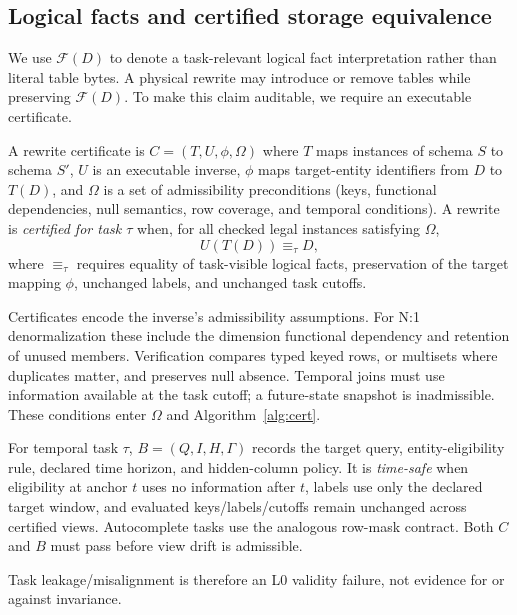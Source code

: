 \documentclass[runningheads]{llncs}
\newcommand{\facts}{\mathcal{F}}
\newcommand{\task}{\tau}
\begin{document}
\subsection{Logical facts and certified storage equivalence}
We use $\facts(D)$ to denote a task-relevant logical fact interpretation rather than literal table bytes. A physical rewrite may introduce or remove tables while preserving $\facts(D)$. To make this claim auditable, we require an executable certificate.

\begin{definition}
A rewrite certificate is $C=(T,U,\phi,\Omega)$ where $T$ maps instances of schema $S$ to schema $S'$, $U$ is an executable inverse, $\phi$ maps target-entity identifiers from $D$ to $T(D)$, and $\Omega$ is a set of admissibility preconditions (keys, functional dependencies, null semantics, row coverage, and temporal conditions). A rewrite is \emph{certified for task $\task$} when, for all checked legal instances satisfying $\Omega$,
\begin{equation}
U(T(D)) \equiv_{\task} D,
\label{eq:roundtrip}
\end{equation}
where $\equiv_{\task}$ requires equality of task-visible logical facts, preservation of the target mapping $\phi$, unchanged labels, and unchanged task cutoffs.
\end{definition}

Certificates encode the inverse's admissibility assumptions. For N:1 denormalization these include the dimension functional dependency and retention of unused members. Verification compares typed keyed rows, or multisets where duplicates matter, and preserves null absence. Temporal joins must use information available at the task cutoff; a future-state snapshot is inadmissible. These conditions enter $\Omega$ and Algorithm~\ref{alg:cert}.

\begin{definition}\label{def:taskcontract}
For temporal task $\task$, $B=(Q,I,H,\Gamma)$ records the target query, entity-eligibility rule, declared time horizon, and hidden-column policy. It is \emph{time-safe} when eligibility at anchor $t$ uses no information after $t$, labels use only the declared target window, and evaluated keys/labels/cutoffs remain unchanged across certified views. Autocomplete tasks use the analogous row-mask contract. Both $C$ and $B$ must pass before view drift is admissible.
\end{definition}
Task leakage/misalignment is therefore an L0 validity failure, not evidence for or against invariance.
\end{document}
